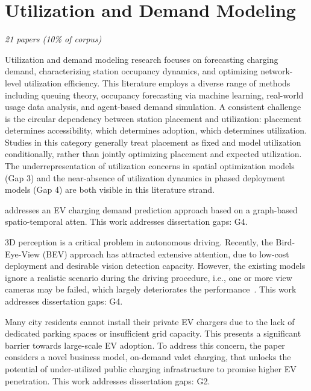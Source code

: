 \documentclass[letterpaper, 12pt, oneside, doublespacing]{Thesis}
\begin{document}
\section{Utilization and Demand Modeling}

\textit{21 papers (10\% of corpus)}

Utilization and demand modeling research focuses on forecasting charging demand, characterizing station occupancy dynamics, and optimizing network-level utilization efficiency. This literature employs a diverse range of methods including queuing theory, occupancy forecasting via machine learning, real-world usage data analysis, and agent-based demand simulation. A consistent challenge is the circular dependency between station placement and utilization: placement determines accessibility, which determines adoption, which determines utilization. Studies in this category generally treat placement as fixed and model utilization conditionally, rather than jointly optimizing placement and expected utilization. The underrepresentation of utilization concerns in spatial optimization models (Gap 3) and the near-absence of utilization dynamics in phased deployment models (Gap 4) are both visible in this literature strand.


\noindent \cite{an_electric_2025} addresses an EV charging demand prediction approach based on a graph-based spatio-temporal atten. This work addresses dissertation gaps: G4.



\noindent 3D perception is a critical problem in autonomous driving. Recently, the Bird-Eye-View (BEV) approach has attracted extensive attention, due to low-cost deployment and desirable vision detection capacity. However, the existing models ignore a realistic scenario during the driving procedure, i.e., one or more view cameras may be failed, which largely deteriorates the performance~\cite{m-bev_masked_2023}. This work addresses dissertation gaps: G4.



\noindent Many city residents cannot install their private EV chargers due to the lack of dedicated parking spaces or insufficient grid capacity. This presents a significant barrier towards large-scale EV adoption. To address this concern, the paper \cite{on-demand_valet_2021} considers a novel business model, on-demand valet charging, that unlocks the potential of under-utilized public charging infrastructure to promise higher EV penetration. This work addresses dissertation gaps: G2.
\end{document}
